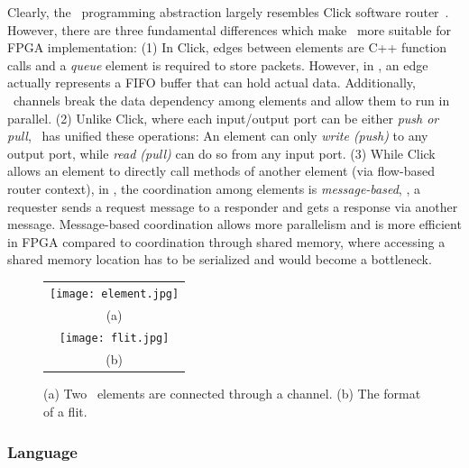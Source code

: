 Clearly, the \name\ programming abstraction largely resembles Click software router~\cite{kohler2000click}. 
However, there are three fundamental differences which make \name\ more suitable
for FPGA implementation:
(1) In Click, edges between elements are C++ function calls and a \textit{queue} element is required to store packets.
However, in \name, an edge actually represents a FIFO buffer that can hold actual data. Additionally, \name\ channels break the data dependency among elements and allow them to run in parallel. 
(2) Unlike Click, where each input/output port can be either \textit{push or pull}, 
\name\ has unified these operations: An element can only \textit{write (push)}  to any output port, while \textit{read (pull)} can do so from any input port.
(3) While Click allows an element to directly call methods of another element (via flow-based router context), in \name,
the coordination among elements is \textit{message-based}, \eg, a requester sends a request message to a responder and gets a response via another message.
%
Message-based coordination allows more parallelism and is more efficient in FPGA compared to coordination through shared memory, where accessing a shared memory location has to be serialized and would become a bottleneck.

\begin{figure}
\centering
\begin{tabular}{c}
\texttt{[image: element.jpg]} \vspace{-6pt} \\
(a)\\
\texttt{[image: flit.jpg]} \\
(b) \\
\end{tabular}
\vspace{-10pt}
\caption{(a) Two \name\ elements are connected through a channel. (b) The format of a flit. }
\label{fig:element}
\vspace{-17pt}
\end{figure}

\subsubsection{Language}

